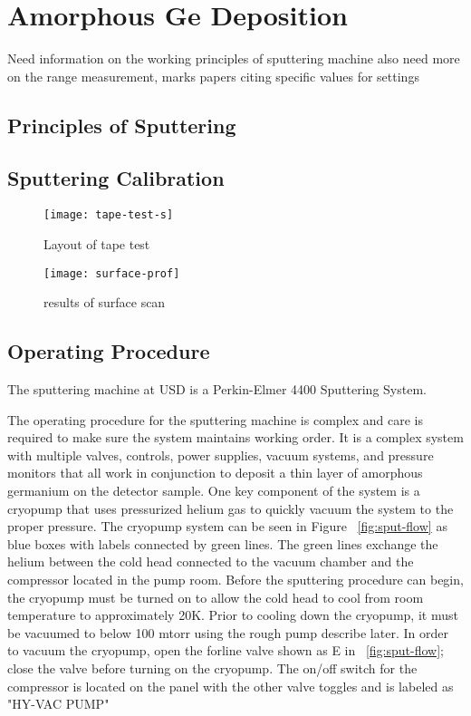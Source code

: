 \section{Amorphous Ge Deposition}

Need information on the working principles of sputtering machine
also need more on the range measurement, marks papers citing specific values for settings 
\subsection{Principles of Sputtering}
\subsection{Sputtering Calibration}

\begin{figure}[htpb]
\centering
\texttt{[image: tape-test-s]}
\caption{Layout of tape test}
\label{fig:tape-test-s}
\end{figure}

\begin{figure}[htpb]
\centering
\texttt{[image: surface-prof]}
\caption{results of surface scan}
\label{fig:surface-prof}
\end{figure}

\subsection{Operating Procedure}
The sputtering machine at USD is a Perkin-Elmer 4400 Sputtering System.

The operating procedure for the sputtering machine is complex and care is required to make sure the system maintains working order.
It is a complex system with multiple valves, controls, power supplies, vacuum systems, and pressure monitors that all work in conjunction to deposit a thin layer of amorphous germanium on the detector sample.
One key component of the system is a cryopump that uses pressurized helium gas to quickly vacuum the system to the proper pressure.
The cryopump system can be seen in Figure ~\ref{fig:sput-flow} as blue boxes with labels connected by green lines.
The green lines exchange the helium between the cold head connected to the vacuum chamber and the compressor located in the pump room.
Before the sputtering procedure can begin, the cryopump must be turned on to allow the cold head to cool from room temperature to approximately 20K.
Prior to cooling down the cryopump, it must be vacuumed to below 100 mtorr using the rough pump describe later.
In order to vacuum the cryopump, open the forline valve shown as E in ~\ref{fig:sput-flow}; close the valve before turning on the cryopump.
The on/off switch for the compressor is located on the panel with the other valve toggles and is labeled as "HY-VAC PUMP"

